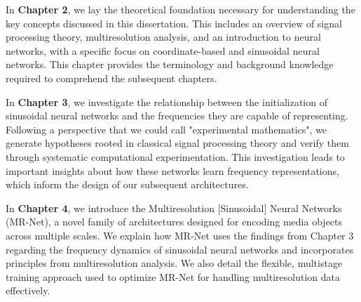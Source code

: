 
In \textbf{Chapter 2}, we lay the theoretical foundation necessary for understanding the key concepts discussed in this dissertation. This includes an overview of signal processing theory, multiresolution analysis, and an introduction to neural networks, with a specific focus on coordinate-based and sinusoidal neural networks. This chapter provides the terminology and background knowledge required to comprehend the subsequent chapters.


In \textbf{Chapter 3}, we investigate the relationship between the initialization of sinusoidal neural networks and the frequencies they are capable of representing. Following a perspective that we could call "experimental mathematics", we generate hypotheses rooted in classical signal processing theory and verify them through systematic computational experimentation. This investigation leads to important insights about how these networks learn frequency representations, which inform the design of our subsequent architectures.


In \textbf{Chapter 4}, we introduce the Multiresolution [Sinusoidal] Neural Networks (MR-Net), a novel family of architectures designed for encoding media objects across multiple scales. We explain how MR-Net uses the findings from Chapter 3 regarding the frequency dynamics of sinusoidal neural networks and incorporates principles from multiresolution analysis. We also detail the flexible, multistage training approach used to optimize MR-Net for handling multiresolution data effectively.

